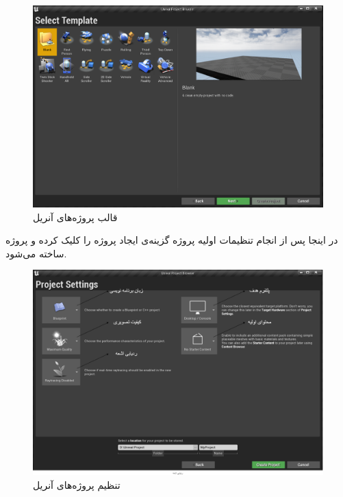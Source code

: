 \begin{figure}[H]
	\centerline{\includegraphics[width=\textwidth,height=\textheight,keepaspectratio]{Figures/Ch2/TemplateSelection.png}}

	\caption{قالب پروژه‌های آنریل}
	\label{fig:Unreal engine Template}
  \end{figure}





در اینجا پس از انجام تنظیمات اولیه پروژه گزینه‌ی ایجاد پروژه را کلیک کرده و پروژه ساخته می‌شود.


\begin{figure}[H]
	\centerline{\includegraphics[width=\textwidth,height=\textheight,keepaspectratio]{Figures/Ch2/UnrealEngineProjectSetting.png}}
	\caption{تنظیم پروژه‌های آنریل}
	\label{fig:Unreal engine Setting}
\end{figure}


